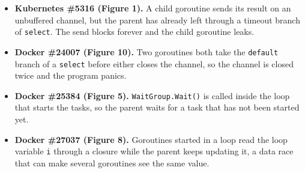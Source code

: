 \begin{itemize}
  \item \textbf{Kubernetes \#5316 (Figure 1).} A child goroutine sends its result on
        an unbuffered channel, but the parent has already left through a timeout
        branch of \texttt{select}. The send blocks forever and the child goroutine
        leaks.
  \item \textbf{Docker \#24007 (Figure 10).} Two goroutines both take the
        \texttt{default} branch of a \texttt{select} before either closes the channel,
        so the channel is closed twice and the program panics.
  \item \textbf{Docker \#25384 (Figure 5).} \texttt{WaitGroup.Wait()} is called inside
        the loop that starts the tasks, so the parent waits for a task that has not
        been started yet.
  \item \textbf{Docker \#27037 (Figure 8).} Goroutines started in a loop read the loop
        variable \texttt{i} through a closure while the parent keeps updating it, a
        data race that can make several goroutines see the same value.
\end{itemize}
